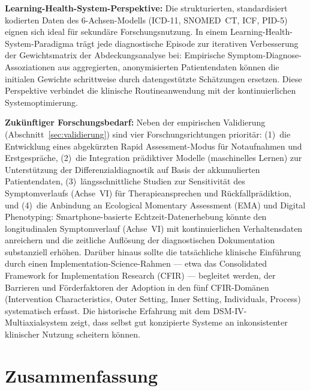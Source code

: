 \documentclass[11pt,a4paper]{article}
\begin{document}
\textbf{Learning-Health-System-Perspektive:} Die strukturierten, standardisiert kodierten Daten des 6-Achsen-Modells (ICD-11, SNOMED~CT, ICF, PID-5) eignen sich ideal f\"ur sekund\"are Forschungsnutzung. In einem Learning-Health-System-Paradigma tr\"agt jede diagnostische Episode zur iterativen Verbesserung der Gewichtsmatrix der Abdeckungsanalyse bei: Empirische Symptom-Diagnose-Assoziationen aus aggregierten, anonymisierten Patientendaten k\"onnen die initialen Gewichte schrittweise durch datengest\"utzte Sch\"atzungen ersetzen. Diese Perspektive verbindet die klinische Routineanwendung mit der kontinuierlichen Systemoptimierung.

\textbf{Zuk\"unftiger Forschungsbedarf:} Neben der empirischen Validierung (Abschnitt~\ref{sec:validierung}) sind vier Forschungsrichtungen priorit\"ar: (1)~die Entwicklung eines abgek\"urzten \glqq Rapid Assessment\grqq{}-Modus f\"ur Notaufnahmen und Erstgespr\"ache, (2)~die Integration pr\"adiktiver Modelle (maschinelles Lernen) zur Unterst\"utzung der Differenzialdiagnostik auf Basis der akkumulierten Patientendaten, (3)~l\"angsschnittliche Studien zur Sensitivit\"at des Symptomverlaufs (Achse~VI) f\"ur Therapieansprechen und R\"uckfallpr\"adiktion, und (4)~die Anbindung an Ecological Momentary Assessment (EMA) und Digital Phenotyping: Smartphone-basierte Echtzeit-Datenerhebung k\"onnte den longitudinalen Symptomverlauf (Achse~VI) mit kontinuierlichen Verhaltensdaten anreichern und die zeitliche Aufl\"osung der diagnostischen Dokumentation substanziell erh\"ohen. Dar\"uber hinaus sollte die tats\"achliche klinische Einf\"uhrung durch einen Implementation-Science-Rahmen --- etwa das Consolidated Framework for Implementation Research (CFIR) --- begleitet werden, der Barrieren und F\"orderfaktoren der Adoption in den f\"unf CFIR-Dom\"anen (Intervention Characteristics, Outer Setting, Inner Setting, Individuals, Process) systematisch erfasst. Die historische Erfahrung mit dem DSM-IV-Multiaxialsystem zeigt, dass selbst gut konzipierte Systeme an inkonsistenter klinischer Nutzung scheitern k\"onnen.


\section{Zusammenfassung}
\label{sec:zusammenfassung}
\end{document}
